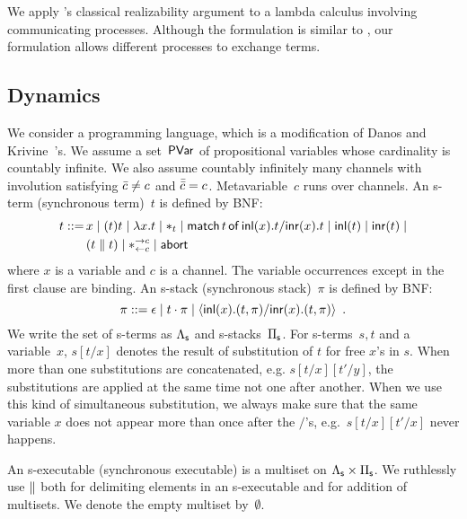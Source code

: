 \documentclass[envcountsame]{llncs}
\begin{document}
We apply \citet{danos-krivine}'s classical realizability argument to a
lambda calculus involving
communicating processes.  Although the formulation is similar to
\citep{danos-krivine}, our formulation allows different processes to
exchange terms.

\subsection{Dynamics}
We consider a programming language, which is a modification of
Danos and Krivine~\citep{danos-krivine}'s.
We assume a set~$\mathsf{PVar}$ of propositional variables whose cardinality is
countably infinite.
We also assume countably infinitely many channels with involution
satisfying $\bar{c}\neq c$ and $\bar{\bar{c}} = c$.
Metavariable~$c$ runs over channels.
An s-term (synchronous term)~$t$ is defined by BNF:
\begin{align*}
 t::= \,&x
 \mid (t)t
 \mid \lambda x.t
 \mid \ast_t
 \mid \mathsf{match}\,{t}\,\mathsf{of}\, \mathsf{inl}({x}). {t}/ \mathsf{inr}({x}). {t}
 \mid \mathsf{inl}({t})
 \mid \mathsf{inr}({t})
 \mid \\ &
 (t\parallel t)
 \mid \ast^{\rightarrow {c}}_{\leftarrow{c}}
 \mid \mathsf{abort\,}
\end{align*}
where $x$ is a variable and $c$ is a channel.  The variable occurrences
except in the first clause are binding.
An s-stack (synchronous stack)~$\pi$ is defined by BNF:
\[
 \pi ::= \epsilon
 \mid t\cdot \pi
 \mid \langle \mathsf{inl}({x}). ({t},{\pi})/ \mathsf{inr}({x}). ({t},{\pi})\rangle
 \enspace.
\]
We write the set of s-terms as $\Lambda_{\mathsf s}$ and s-stacks~$\Pi_{\mathsf s}$.
For s-terms~$s,t$ and a variable~$x$, $s[t/x]$ denotes the result of
substitution of $t$ for free $x$'s in $s$.  When more than one
substitutions are concatenated, e.g. $s[t/x][t'/y]$, the substitutions
are applied at the same time not one after another.  When we use this
kind of simultaneous substitution, we always make sure that the same
variable $x$ does not appear more than once after the $/$'s,
e.g.~$s[t/x][t'/x]$ never happens.

An s-executable (synchronous executable)
is a multiset on $\Lambda_{\mathsf s}\times\Pi_{\mathsf s}$.
We ruthlessly use $\parallel$ both for delimiting elements in an
s-executable and for addition of multisets.
We denote the empty multiset by~$\emptyset$.
\end{document}
